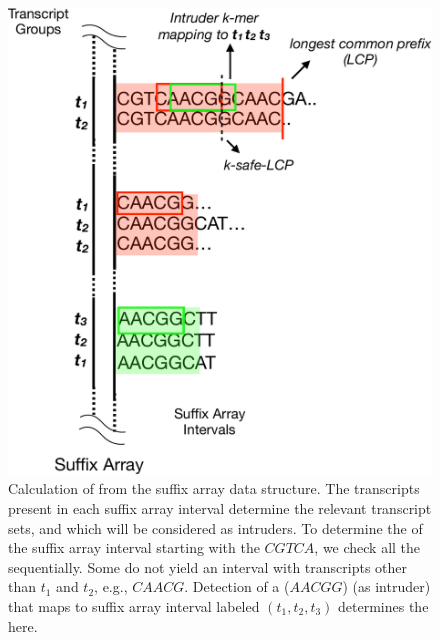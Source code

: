 \begin{figure}
 \centering
 \includegraphics[scale=0.25]{Figures/sla/ksafelcp}
 \caption[Calculation of \kslcp from the suffix array data structure]
    {Calculation of \kslcp from the suffix array data structure. The
    transcripts present in each suffix array interval determine the relevant
    transcript sets, and which \kmers will be considered as intruders. To
    determine the \kslcp of the suffix array interval starting with the \kmer
    $CGTCA$, we check all the \kmers sequentially. Some \kmers do not yield an
    interval with transcripts other than $t_1$ and $t_2$, e.g., $CAACG$.
    Detection of a \kmer ($AACGG$) (as intruder) that maps to suffix array interval 
    labeled $(t_1,t_2,t_3)$ determines the \kslcp here.}
    \label{fig:safelength}
\end{figure}

